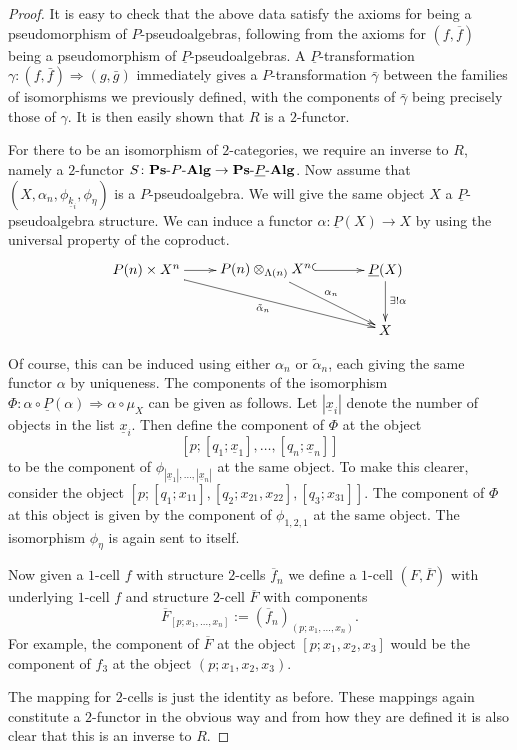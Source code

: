 \begin{proof}
It is easy to check that the above data satisfy the axioms for being a pseudomorphism of $P$-pseudoalgebras, following from the axioms for $(f,\overline{f})$ being a pseudomorphism of $\underline{P}$-pseudoalgebras. A $\underline{P}$-transformation $\gamma \colon (f, \bar{f}) \Rightarrow (g, \bar{g})$ immediately gives a $P$-transformation $\bar{\gamma}$ between the families of isomorphisms we previously defined, with the components of $\bar{\gamma}$ being precisely those of $\gamma$. It is then easily shown that $R$ is a $2$-functor.

For there to be an isomorphism of $2$-categories, we require an inverse to $R$, namely a $2$-functor $S \colon \mathbf{Ps}\mbox{-}P\mbox{-}\mathbf{Alg} \rightarrow \mathbf{Ps}\mbox{-}\underline{P}\mbox{-}\mathbf{Alg}$. Now assume that $(X, \alpha_n, \phi_{\underline{k}_i}, \phi_\eta)$ is a $P$-pseudoalgebra. We will give the same object $X$ a $\underline{P}$-pseudoalgebra structure. We can induce a functor $\alpha \colon \underline{P}(X) \rightarrow X$ by using the universal property of the coproduct.
    \[
        \xy
            (-30,0)*+{P(n) \times X^n}="-10";
            (0,0)*+{\coeq{P}{X}{\Lambda}{n}}="00";
            (30,0)*+{\underline{P}(X)}="10";
            (30,-15)*+{X}="11";
            {\ar "-10" ; "00"};
            {\ar^{\alpha_n} "00" ; "11"};
            {\ar@{^{(}->} "00" ; "10"};
            {\ar^{\exists ! \alpha} "10" ; "11"};
            {\ar_{\tilde{\alpha}_n} "-10" ; "11"};
        \endxy
    \]

Of course, this can be induced using either $\alpha_n$ or $\tilde{\alpha}_n$, each giving the same functor $\alpha$ by uniqueness. The components of the isomorphism $\Phi \colon \alpha \circ \underline{P}(\alpha) \Rightarrow \alpha \circ \mu_X$ can be given as follows. Let $\left|\underline{x}_i\right|$ denote the number of objects in the list $\underline{x}_i$. Then define the component of $\Phi$ at the object
    \[
        \left[p;\left[q_1;\underline{x}_1\right],\ldots,\left[q_n;\underline{x}_n\right]\right]
    \]
to be the component of $\phi_{\left|\underline{x}_1\right|, \ldots, |\underline{x}_n|}$ at the same object. To make this clearer, consider the object $[p;[q_1;x_{11}],[q_2;x_{21},x_{22}],[q_3;x_{31}]]$. The component of $\Phi$ at this object is given by the component of $\phi_{1,2,1}$ at the same object. The isomorphism $\phi_\eta$ is again sent to itself.

Now given a $1$-cell $f$ with structure $2$-cells $\overline{f}_n$ we define a $1$-cell $(F,\overline{F})$ with underlying $1$-cell $f$ and structure $2$-cell $\overline{F}$ with components
    \[
        \overline{F}_{[p;x_1, \ldots, x_n]} := \left(\overline{f}_{n}\right)_{(p;x_1,\ldots,x_n)}.
    \]
For example, the component of $\overline{F}$ at the object $[p;x_1,x_2,x_3]$ would be the component of $f_3$ at the object $(p;x_1,x_2,x_3)$.

The mapping for $2$-cells is just the identity as before. These mappings again constitute a $2$-functor in the obvious way and from how they are defined it is also clear that this is an inverse to $R$.
\end{proof}


